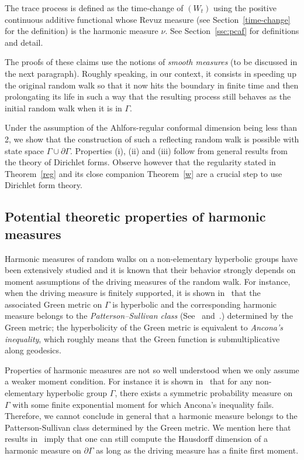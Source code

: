 \documentclass[10pt]{amsart}
\theoremstyle{definition}\newtheorem{defi}[theo]{Definition}\newtheorem{rema}[theo]{Remark}\newtheorem{exam}[theo]{Example}\newtheorem{exem}[theo]{Example}\newtheorem{nota}[theo]{Notation}
\begin{document}
The trace process is defined as the time-change of $(W_t)$ using the positive continuous additive functional whose Revuz measure (see Section~\ref{time-change} for the definition) is the harmonic measure $\nu$. See Section~\ref{ssc:pcaf} for definitions and detail.



The proofs of these claims use the notions of \emph{smooth measures} (to be discussed in the next paragraph). Roughly speaking, in our context, it consists in speeding up the original random walk so that it now hits the boundary in finite time and then prolongating its life in such a way that the resulting process still behaves as the initial random walk when it is in $\Gamma$.

Under the assumption of the Ahlfors-regular conformal dimension being less than 2, we show that the construction of such a reflecting random walk is possible with state space $\Gamma\cup\partial\Gamma$. Properties (i), (ii) and (iii) follow from general results from the theory of Dirichlet forms. Observe however that the regularity stated in Theorem~\ref{reg} and its close companion Theorem~\ref{w} are a crucial step to use Dirichlet form theory.



\subsection*{Potential theoretic properties of harmonic measures}

Harmonic measures of random walks on a non-elementary hyperbolic groups have been extensively studied and it is known that their behavior strongly depends on moment assumptions of the driving measures of the random walk. For instance, when the driving measure is finitely supported, it is shown in~\cite{BHM} that the associated Green metric on $\Gamma$ is hyperbolic and the corresponding harmonic measure belongs to the \emph{Patterson--Sullivan class} (See~\cite{Coo} and~\cite{Ha2}.) determined by the Green metric; the hyperbolicity of the Green metric is equivalent to \emph{Ancona's inequality}, which roughly means that the Green function is submultiplicative along geodesics.

Properties of harmonic measures are not so well understood when we only assume a weaker moment condition. For instance it is shown in~\cite{Gou} that for any non-elementary hyperbolic group $\Gamma$, there exists a symmetric probability measure on $\Gamma$ with some finite exponential moment for which Ancona's inequality fails. Therefore, we cannot conclude in general that a harmonic measure belongs to the Patterson-Sullivan class determined by the Green metric. We mention here that results in~\cite{T} imply that one can still compute the Hausdorff dimension of a harmonic measure on $\partial\Gamma$ as long as the driving measure has a finite first moment.
\end{document}
